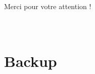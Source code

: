 \documentclass[8pt]{beamer}
\begin{document}
  \begin{frame}
  ~ \\
  ~ \\
  ~ \\
  ~ \\
  ~ \\
  ~ \\
    \centering \large Merci pour votre attention !
  ~ \\
  ~ \\
  ~ \\    
  \end{frame}


  

  \section*{Backup}
\end{document}
